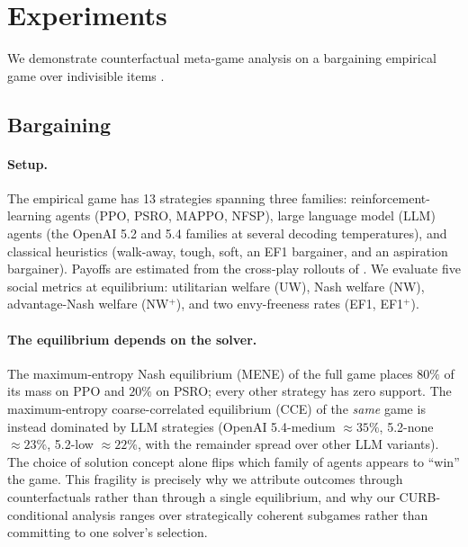 \documentclass[sigconf,anonymous]{aamas}
\begin{document}
\section{Experiments}
\label{sec:experiments}

We demonstrate counterfactual meta-game analysis on a bargaining empirical game over indivisible items \citep{smithline2025measuring}.

\subsection{Bargaining}
\label{sec:exp-bargaining}

\paragraph{Setup.} The empirical game has 13 strategies spanning three families: reinforcement-learning agents (PPO, PSRO, MAPPO, NFSP), large language model (LLM) agents (the OpenAI 5.2 and 5.4 families at several decoding temperatures), and classical heuristics (walk-away, tough, soft, an EF1 bargainer, and an aspiration bargainer). Payoffs are estimated from the cross-play rollouts of \citet{smithline2025measuring}. We evaluate five social metrics at equilibrium: utilitarian welfare (UW), Nash welfare (NW), advantage-Nash welfare (NW$^+$), and two envy-freeness rates (EF1, EF1$^+$).

\paragraph{The equilibrium depends on the solver.} The maximum-entropy Nash equilibrium (MENE) of the full game places $80\%$ of its mass on PPO and $20\%$ on PSRO; every other strategy has zero support. The maximum-entropy coarse-correlated equilibrium (CCE) of the \emph{same} game is instead dominated by LLM strategies (OpenAI 5.4-medium $\approx 35\%$, 5.2-none $\approx 23\%$, 5.2-low $\approx 22\%$, with the remainder spread over other LLM variants). The choice of solution concept alone flips which family of agents appears to ``win'' the game. This fragility is precisely why we attribute outcomes through counterfactuals rather than through a single equilibrium, and why our CURB-conditional analysis ranges over strategically coherent subgames rather than committing to one solver's selection.
\end{document}

